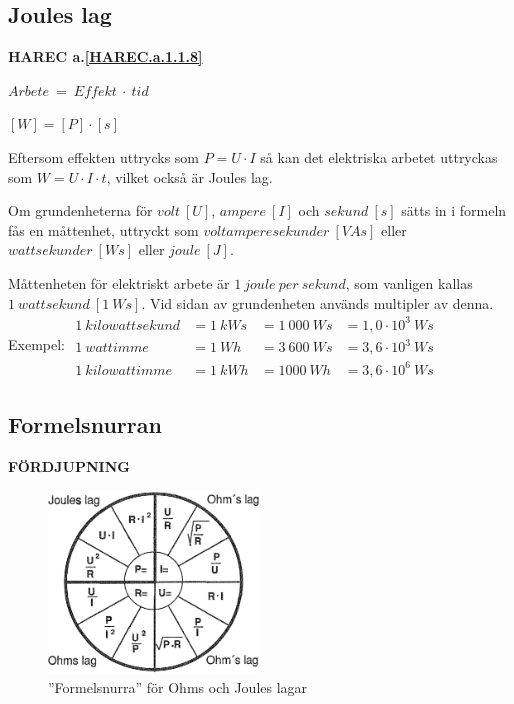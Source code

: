 \subsection{Joules lag}
\textbf{HAREC a.\ref{HAREC.a.1.1.8}\label{myHAREC.a.1.1.8}}

\(Arbete\ =\ Effekt\ \cdot\ tid\)

\([W] = [P] \cdot [s]\)

Eftersom effekten uttrycks som \(P = U \cdot I\) så kan det elektriska arbetet
uttryckas som \(W = U \cdot I \cdot t\), vilket också är Joules lag.

Om grundenheterna för \(volt\ [U]\), \(ampere\ [I]\) och \(sekund\ [s]\) sätts
in i formeln fås en måttenhet, uttryckt som \(voltamperesekunder\ [VAs]\) eller
\(wattsekunder\ [Ws]\) eller \(joule\ [J]\).

Måttenheten för elektriskt arbete är \(1\ joule\ per\ sekund\), som vanligen
kallas \(1\ wattsekund\ [1\ Ws]\).
Vid sidan av grundenheten används multipler av denna.
Exempel:
\(
\begin{array}{llll}
1\ kilowattsekund & = 1\ kWs & = 1\ 000\ Ws & = 1,0 \cdot 10^3\ Ws\\
1\ wattimme & = 1\ Wh & = 3\ 600\ Ws & = 3,6 \cdot 10^3\ Ws \\
1\ kilowattimme & = 1\ kWh & = 1 000\ Wh & = 3,6 \cdot 10^6\ Ws
\end{array}
\)

\subsection{Formelsnurran}
\textbf{FÖRDJUPNING}

\begin{figure}[ht]
\begin{center}
  \includegraphics[width=0.5\textwidth]{images/cropped_pdfs/bild_2_1-04.pdf}
  \caption{''Formelsnurra'' för Ohms och Joules lagar}
  \label{fig:BildII1-4}
\end{center}
\end{figure}

